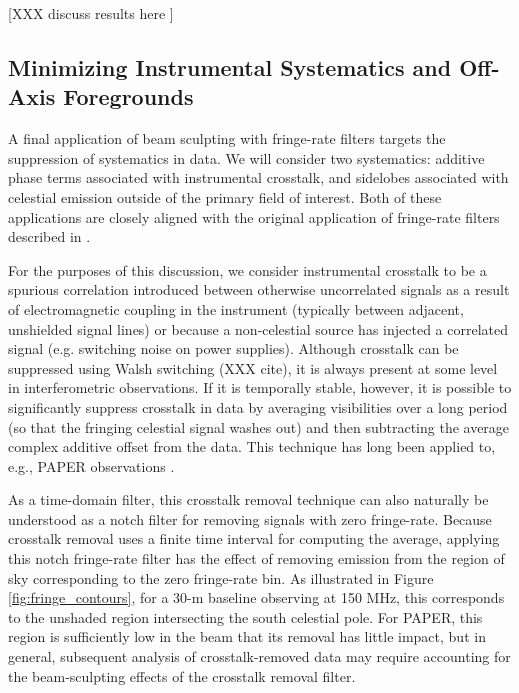 \documentclass[twocolumn,apj,numberedappendix]{emulateapj}
\begin{document}
[XXX discuss results here ]

\subsection{Minimizing Instrumental Systematics and Off-Axis Foregrounds}
\label{sec:foregrounds}


A final application of beam sculpting with fringe-rate filters targets the suppression of systematics in data.
We will consider two systematics: additive phase terms associated with instrumental crosstalk, and sidelobes
associated with celestial emission outside of the primary field of interest.  Both of these applications are 
closely aligned with the original application of fringe-rate filters described in \citet{parsons_backer2009}.

For the purposes of this discussion, we consider instrumental crosstalk to be a spurious 
correlation introduced between otherwise uncorrelated signals
as a result of electromagnetic coupling in the instrument (typically between adjacent, unshielded signal lines)
or because a non-celestial source has injected a correlated signal (e.g. switching noise on power supplies).
Although crosstalk can be suppressed using Walsh switching (XXX cite), it is always present at some level
in interferometric observations.  If it is temporally stable, however, it is possible to significantly
suppress crosstalk in data by averaging visibilities over a long period (so that the fringing celestial
signal washes out) and then subtracting the average complex additive offset from the data.  This 
technique has
long been applied to, e.g., PAPER observations \citep{parsons_et_al2010,jacobs_et_al,pober_et_al,P14}.

As a time-domain filter, this crosstalk removal technique can also naturally be understood as a notch filter
for removing signals with zero fringe-rate.  Because crosstalk removal uses a finite time interval for computing
the average, applying this notch fringe-rate filter has the effect of removing emission from the region of
sky corresponding to the zero fringe-rate bin.  As illustrated in Figure \ref{fig:fringe_contours}, for
a 30-m baseline observing at 150 MHz, this corresponds to the unshaded region intersecting the south celestial pole.
For PAPER, this region is sufficiently low in the beam that its removal has little impact, but in general, 
subsequent analysis of crosstalk-removed data may require accounting for the beam-sculpting effects of
the crosstalk removal filter.
\end{document}
